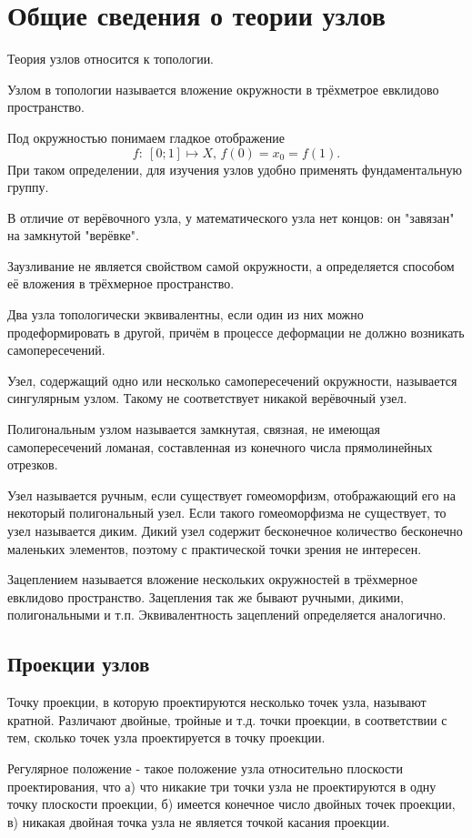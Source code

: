 \section{Общие сведения о теории узлов}

Теория узлов относится к топологии.

Узлом в топологии называется вложение окружности в трёхметрое евклидово пространство.

Под окружностью понимаем гладкое отображение
$$f:\: \left[0;1\right]\mapsto X,\, f(0) = x_0 = f(1).$$
При таком определении, для изучения узлов удобно применять фундаментальную группу.

В отличие от верёвочного узла, у математического узла нет концов: он "завязан" на замкнутой "верёвке".

Заузливание не является свойством самой окружности, а определяется способом её вложения в трёхмерное пространство.

Два узла топологически эквивалентны, если один из них можно продеформировать в другой, причём в процессе деформации не должно возникать самопересечений.

Узел, содержащий одно или несколько самопересечений окружности, называется сингулярным узлом. Такому не соответствует никакой верёвочный узел.

Полигональным узлом называется замкнутая, связная, не имеющая самопересечений ломаная, составленная из конечного числа прямолинейных отрезков.

Узел называется ручным, если существует гомеоморфизм, отображающий его на некоторый полигональный узел. Если такого гомеоморфизма не существует, то узел называется диким. Дикий узел содержит бесконечное количество бесконечно маленьких элементов, поэтому с практической точки зрения не интересен.

Зацеплением называется вложение нескольких окружностей в трёхмерное евклидово пространство. Зацепления так же бывают ручными, дикими, полигональными и т.п. Эквивалентность зацеплений определяется аналогично.

\subsection{Проекции узлов}

Точку проекции, в которую проектируются несколько точек узла, называют кратной. Различают двойные, тройные и т.д. точки проекции, в соответствии с тем, сколько точек узла проектируется в точку проекции.

Регулярное положение - такое положение узла относительно плоскости проектирования, что
а) что никакие три точки узла не проектируются в одну точку плоскости проекции, б) имеется конечное число двойных точек проекции, в) никакая двойная точка узла не является точкой касания проекции.

